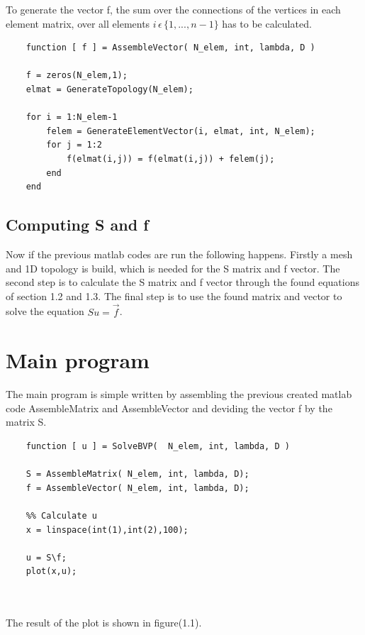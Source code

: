 \documentclass[a4paper]{report}
\begin{document}
\smallskip

To generate the vector f, the sum over the connections of the vertices in each element matrix, over all elements $i\,\epsilon\, \{1,...,n-1\}$  has to be calculated. 

\bigskip

	
\begin{lstlisting}
	function [ f ] = AssembleVector( N_elem, int, lambda, D )
		
	f = zeros(N_elem,1);
	elmat = GenerateTopology(N_elem);
		
	for i = 1:N_elem-1
		felem = GenerateElementVector(i, elmat, int, N_elem);
		for j = 1:2
			f(elmat(i,j)) = f(elmat(i,j)) + felem(j);
		end
	end
\end{lstlisting}	




\subsection{Computing S and f}

Now if the previous matlab codes are run the following happens. Firstly a mesh and 1D topology is build, which is needed for the S matrix and f vector. The second step is to calculate the S matrix and f vector through the found equations of section 1.2 and 1.3. The final step is to use the found matrix and vector to solve the equation $Su=\vec{f}$.





\section{Main program}

The main program is simple written by assembling the previous created matlab code AssembleMatrix and AssembleVector and deviding the vector f by the matrix S.
\begin{lstlisting}
	function [ u ] = SolveBVP(  N_elem, int, lambda, D )
	
	S = AssembleMatrix( N_elem, int, lambda, D);
	f = AssembleVector( N_elem, int, lambda, D);
	
	%% Calculate u
	x = linspace(int(1),int(2),100);
	
	u = S\f;
	plot(x,u); 
	
	
\end{lstlisting}
The result of the plot is shown in figure(1.1).
\end{document}
